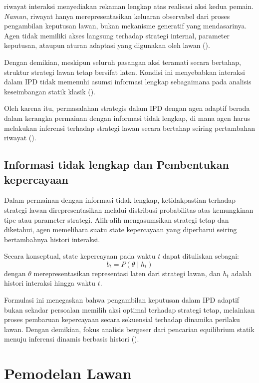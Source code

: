 riwayat interaksi menyediakan rekaman lengkap atas realisasi aksi kedua pemain. \textit{Namun}, riwayat hanya merepresentasikan keluaran observabel dari proses pengambilan keputusan lawan, bukan mekanisme generatif yang mendasarinya. Agen tidak memiliki akses langsung terhadap strategi internal, parameter keputusan, ataupun aturan adaptasi yang digunakan oleh lawan (\cite{bonanno_game_2024}).

Dengan demikian, meskipun seluruh pasangan aksi teramati secara bertahap, struktur strategi lawan tetap bersifat laten. Kondisi ini menyebabkan interaksi dalam IPD tidak memenuhi asumsi informasi lengkap sebagaimana pada analisis keseimbangan statik klasik (\cite{bonanno_game_2024}).

Oleh karena itu, permasalahan strategis dalam IPD dengan agen adaptif berada dalam kerangka permainan dengan informasi tidak lengkap, di mana agen harus melakukan inferensi terhadap strategi lawan secara bertahap seiring pertambahan riwayat (\cite{bonanno_game_2024}).


\subsection{Informasi tidak lengkap dan Pembentukan kepercayaan}

Dalam permainan dengan informasi tidak lengkap, ketidakpastian terhadap strategi lawan direpresentasikan melalui distribusi probabilitas atas kemungkinan tipe atau parameter strategi. Alih-alih mengasumsikan strategi tetap dan diketahui, agen memelihara suatu state kepercayaan yang diperbarui seiring bertambahnya histori interaksi.

Secara konseptual, state kepercayaan pada waktu $t$ dapat dituliskan sebagai:
\[
b_t = P(\theta \mid h_t)
\]
dengan $\theta$ merepresentasikan representasi laten dari strategi lawan, dan $h_t$ adalah histori interaksi hingga waktu $t$.

Formulasi ini menegaskan bahwa pengambilan keputusan dalam IPD adaptif bukan sekadar persoalan memilih aksi optimal terhadap strategi tetap, melainkan proses pembaruan kepercayaan secara sekuensial terhadap dinamika perilaku lawan. Dengan demikian, fokus analisis bergeser dari pencarian equilibrium statik menuju inferensi dinamis berbasis histori (\cite{bonanno_game_2024}).

\section{Pemodelan Lawan}

